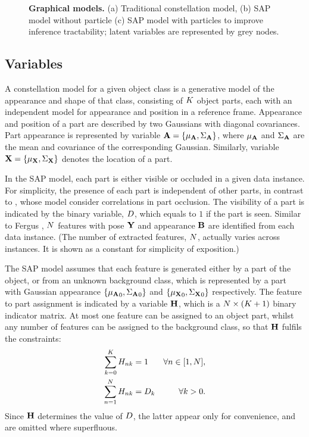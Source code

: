 \begin{figure}[ht]
\begin{subfigure}[t]{0.48\linewidth}
	\label{fig/reg/graphicalModelParticle}
\end{subfigure}
\caption{\textbf{Graphical models.} (a) Traditional constellation model, (b) SAP model without particle (c) SAP model with particles to improve inference tractability; latent variables are represented by grey nodes.}
\label{fig/reg/graphicalmodel}
\end{figure} 

\subsection{Variables}

A constellation model for a given object class is a generative model of the appearance and shape of that class, consisting of $K$ object parts, each with an independent model for appearance and position in a reference frame. Appearance and position of a part are described by two Gaussians with diagonal covariances. Part appearance is represented by variable $\mathbf{A}=\{{\mu_{\mathbf{A}}},{\Sigma_{\mathbf{A}}}\}$, where ${\mu_{\mathbf{A}}}$ and ${\Sigma_{\mathbf{A}}}$ are the mean and covariance of the corresponding Gaussian. Similarly, variable $\mathbf{X}=\{{\mu_{\mathbf{X}}},{\Sigma_{\mathbf{X}}}\}$ denotes the location of a part. 

In the SAP model, each part is either visible or occluded in a given data instance.   
For simplicity, the presence of each part is independent of other parts, in contrast to \cite{Fergus2007, Weber2000}, whose model consider correlations in part occlusion. 
The visibility of a part is indicated by the binary variable, ${D}$, which equals to $1$ if the part is seen. Similar to Fergus \etal \cite{Fergus2007}, $N$ features with pose $\mathbf{Y}$ and appearance $\mathbf{B}$ are identified from each data instance. (The number of extracted features, $N$, actually varies across instances. It is shown as a constant for simplicity of exposition.)  

The SAP model assumes that each feature is generated either by a part of the object, or from an unknown background class, which is represented by a part with Gaussian appearance $\{{\mu_{\mathbf{A}}}_0, {\Sigma_{\mathbf{A}}}_0\}$ and $\{{\mu_{\mathbf{X}}}_0, {\Sigma_{\mathbf{X}}}_0\}$ respectively. 
The feature to part assignment is indicated by a variable $\mathbf{H}$, which is a $N \times (K + 1)$ binary indicator matrix. 
At most one feature can be assigned to an object part, whilst any number of features can be assigned to the background class, so that $\mathbf{H}$ fulfils the constraints: 
\begin{equation}
	\begin{aligned}
		\sum_{k = 0}^{K}{H}_{nk}& =1 & \forall n \in [1, N], \\ 
		\sum_{n = 1}^{N}{H}_{nk}& ={D}_k & \forall k>0.
	\end{aligned} 
\end{equation}
Since $\mathbf{H}$ determines the value of ${D}$, the latter appear only for convenience, and are omitted where superfluous. 

